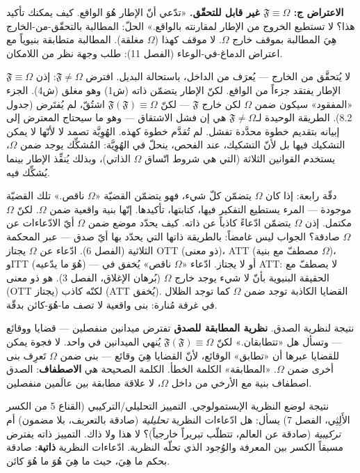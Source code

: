 \documentclass[10pt, openany, oneside]{book}
\begin{document}
\textbf{الاعتراض ج: $\mathfrak{F} \equiv \Omega$ غير قابل للتحقّق.} «تدّعي أنّ الإطار هُوَ الواقع. كيف يمكنك تأكيد هذا؟ لا تستطيع الخروج من الإطار لمقارنته بالواقع.» الحلّ: المطالبة بالتحقّق-من-الخارج هِيَ المطالبة بموقف خارج $\Omega$. لا موقف كهذا ($\Omega$ مغلقة). المطالبة متطابقة بنيوياً مع اعتراض الدماغ-في-الوعاء (الفصل 11): طلب وجهة نظر من اللامكان.

$\mathfrak{F} \equiv \Omega$ لا يُتحقَّق من الخارج --- يُعرَف من الداخل، باستحالة البديل. افترض $\mathfrak{F} \neq \Omega$: إذن الإطار يفتقد جزءاً من الواقع. لكنّ الإطار يتضمّن ذاته (ش1) وهو مغلق (ش4). الجزء «المفقود» سيكون ضمن $\Omega$ لكن خارج $\mathfrak{F}$ --- لكنّ $\mathfrak{F}(\mathfrak{F}) \equiv \Omega$ اشتُقّ، لم يُفتَرض (جدول 8.2). الطريقة الوحيدة لـ$\mathfrak{F} \neq \Omega$ هي إن فشل الاشتقاق --- وهو ما سيحتاج المعترض إلى إبيانه بتقديم خطوة محدَّدة تفشل. لم تُقدَّم خطوة كهذه. الهُوِيَّة تصمد لا لأنّها لا يمكن التشكيك فيها بل لأنّ التشكيك، عند الفحص، ينحلّ في الهُوِيَّة: المُشكِّك يوجد ضمن $\Omega$، يستخدم القوانين الثلاثة (التي هي شروط اتّساق $\Omega$ الذاتي)، وبذلك يُنفِّذ الإطار بينما يُشكِّك فيه.

دقّة رابعة: إذا كان $\Omega$ يتضمّن كلّ شيء، فهو يتضمّن القضيّة «$\Omega$ ناقص.» تلك القضيّة موجودة --- المرء يستطيع التفكير فيها، كتابتها، تأكيدها. إنّها بنية واقعية ضمن $\Omega$. لكنّ $\Omega$ مكتمل. إذن $\Omega$ يتضمّن ادّعاءً كاذباً عن ذاته. كيف يحدّد موضع ضمن $\Omega$ أيّ الادّعاءات عن $\Omega$ صادقة؟ الجواب ليس غامضاً: بالطريقة ذاتها التي يحدّد بها أيّ صدق --- عبر المحكمة الثلاثية (الفصل 6). ادّعاء عن $\Omega$ يجتاز OTT (ذو معنى)، ATT (مصطفّ مع بنية $\Omega$)، وITT (هُوَ ما يدّعيه) --- أو لا يجتاز. ادّعاء «$\Omega$ ناقص» يُخفق في ATT: لا يصطفّ مع الحقيقة البنيوية بأنّ لا شيء يوجد خارج $\Omega$ (بُرهان الإغلاق، الفصل 3). هو ذو معنى (OTT يجتاز) لكنّه كاذب (ATT يُخفق). القضايا الكاذبة توجد ضمن $\Omega$ كما توجد الظلال في غرفة مُنارة: بنى واقعية لا تصف ما-هُوَ-كائن بدقّة.

نتيجة لنظرية الصدق. \textbf{نظرية المطابقة للصدق} تفترض ميدانين منفصلين --- قضايا ووقائع --- وتسأل هل «تتطابقان.» لكنّ $\mathfrak{F}(\mathfrak{F}) \equiv \Omega$ يُنهي الميدانين في واحد. لا فجوة يمكن للقضايا عبرها أن «تطابق» الوقائع، لأنّ القضايا هِيَ وقائع --- بنى ضمن $\Omega$ تَعرِف بنى أخرى ضمن $\Omega$. «المطابقة» الكلمة الخطأ. الكلمة الصحيحة هي \textbf{الاصطفاف}: الصدق اصطفاف بنية مع الأرخي من داخل $\Omega$، لا علاقة مطابقة بين عالَمين منفصلين.

نتيجة لوضع النظرية الإبستمولوجي. التمييز التحليلي/التركيبي (القناع 5 من الكسر الأَلِثِي، الفصل 7) يسأل: هل ادّعاءات النظرية \textit{تحليلية} (صادقة بالتعريف، بلا مضمون) أم \textit{تركيبية} (صادقة عن العالم، تتطلّب تبريراً خارجياً)؟ لا هذا ولا ذاك. التمييز ذاته يفترض مسبقاً الكسر بين المعرفة والوُجود الذي تحلّه النظرية. ادّعاءات النظرية \textbf{ذاتية}: صادقة بحكم ما هِيَ، حيث ما هِيَ هُوَ ما هُوَ كائن.
\end{document}
